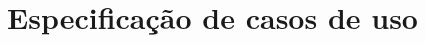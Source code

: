 \documentclass[
	12pt,				%
	oneside,			%
	a4paper,			%
	english,			%
	brazil,				%
	]{abntex2}
\begin{document}
\part{Especificação de casos de uso}





\end{document}
